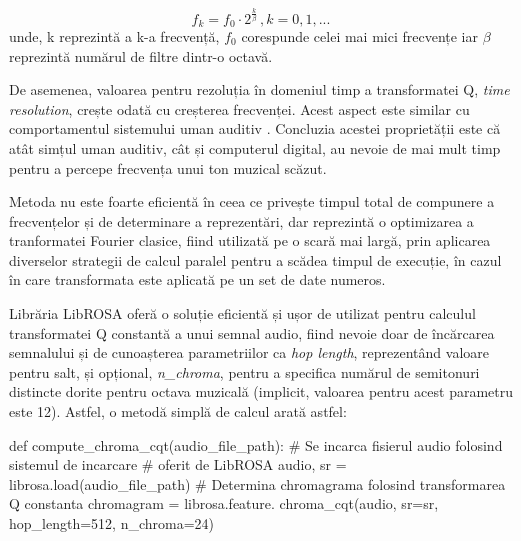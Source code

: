 \documentclass[a4paper,12pt]{report}
\begin{document}
\begin{equation*}
    f_k = f_0 \cdot 2 ^ { \frac{k}{{\beta}}\ }, k=0,1,...
\end{equation*} 
unde, k reprezintă a k-a frecvență, $f_0$ corespunde celei mai mici frecvențe iar $\beta$
reprezintă numărul de filtre dintr-o octavă. 

De asemenea, valoarea pentru rezoluția în domeniul timp a
transformatei Q, \emph{time resolution}, crește odată cu creșterea frecvenței. Acest aspect
este similar cu comportamentul sistemului uman auditiv \cite{Bonvini-Recognition}. 
Concluzia acestei proprietății este că atât simțul uman auditiv, cât și computerul digital, au
nevoie de mai mult timp pentru a percepe frecvența unui ton muzical scăzut.

Metoda nu este foarte eficientă în ceea ce privește timpul total de compunere a 
frecvențelor și de determinare a reprezentări, dar reprezintă o optimizarea a
tranformatei Fourier clasice, fiind utilizată pe o scară mai largă, prin aplicarea
diverselor strategii de calcul paralel pentru a scădea timpul de execuție, în cazul
în care transformata este aplicată pe un set de date numeros.

Librăria LibROSA oferă o soluție eficientă și ușor 
de utilizat pentru calculul transformatei Q constantă a unui semnal audio, fiind nevoie doar 
de încărcarea semnalului și de cunoașterea parametriilor ca \emph{hop length}, reprezentând 
valoare pentru salt, și opțional, \emph{n{\_}chroma}, pentru a specifica numărul de semitonuri 
distincte dorite pentru octava muzicală (implicit, valoarea pentru acest 
parametru este 12). Astfel, o metodă simplă de calcul arată astfel:

\begin{python}

    def compute_chroma_cqt(audio_file_path):
        #   Se incarca fisierul audio folosind sistemul de incarcare 
        # oferit de LibROSA
        audio, sr = librosa.load(audio_file_path)
        #   Determina chromagrama folosind transformarea Q constanta 
        chromagram = librosa.feature.
                chroma_cqt(audio, sr=sr, hop_length=512, n_chroma=24)
\end{python}
\end{document}
